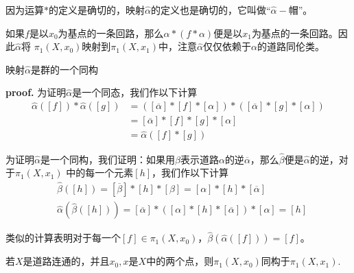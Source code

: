 \vspace*{1em}

因为运算$*$的定义是确切的，映射$\hat{\alpha}$的定义也是确切的，它叫做“$\hat{\alpha}-$帽”。

如果$f$是以$x_0$为基点的一条回路，那么$\alpha*(f*\alpha)$便是以$x_1$为基点的一条回路。因此$\hat{\alpha}$将
$\pi_1(X,x_0)$映射到$\pi_1(X,x_1)$中，注意$\hat{\alpha}$仅仅依赖于$\alpha$的道路同伦类。

\vspace*{1em}

\begin{mdframed}
    \begin{theorem}
        映射$\hat{\alpha}$是群的一个同构
    \end{theorem}
\end{mdframed}

\textbf{proof.} 为证明$\hat{\alpha}$是一个同态，我们作以下计算
\begin{equation}
    \begin{aligned}
        \hat{\alpha}([f])*\hat{\alpha}([g]) &= ([\overline{\alpha}]*[f]*[\alpha])*([\overline{\alpha}]*[g]*[\alpha]) \\
        & = [\overline{\alpha}]*[f]*[g]*[\alpha]\\
        & = \hat{\alpha}([f]*[g])
    \end{aligned}
\end{equation}

为证明$\hat{\alpha}$是一个同构，我们证明：如果用$\beta$表示道路$\alpha$的逆$\overline{\alpha}$，那么$\hat{\beta}$便是$\hat{\alpha}$的逆，对于$\pi_1(X,x_1)$
中的每一个元素$[h]$，我们作以下计算
\begin{equation}
    \begin{aligned}
        & \hat{\beta}([h])=[\overline{\beta}]*[h]*[\beta]=[\alpha]*[h]*[\overline{\alpha}]\\
        & \hat{\alpha}(\hat{\beta}([h]))=[\overline{\alpha}]*([\alpha]*[h]*[\overline{\alpha}])*[\alpha]=[h]
    \end{aligned}
\end{equation}
 
类似的计算表明对于每一个$[f]\in \pi_1(X,x_0)$，$\hat{\beta}(\hat{\alpha}([f]))=[f]$。

\begin{mdframed}
    \begin{corollary}
        若$X$是道路连通的，并且$x_0,x$是$X$中的两个点，则$\pi_1(X,x_0)$同构于$\pi_1(X,x_1)$.
    \end{corollary}
\end{mdframed}

